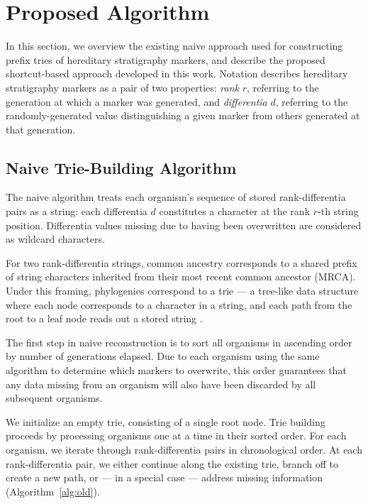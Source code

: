 \section{Proposed Algorithm} \label{sec:algorithm}

In this section, we overview the existing naive approach used for constructing prefix tries of hereditary stratigraphy markers, and describe the proposed shortcut-based approach developed in this work.
Notation describes hereditary stratigraphy markers as a pair of two properties: \textit{rank} $r$, referring to the generation at which a marker was generated, and \textit{differentia} $d$, referring to the randomly-generated value distinguishing a given marker from others generated at that generation.

\subsection{Naive Trie-Building Algorithm} \label{sec:algorithm:naive}

The naive algorithm treats each organism's sequence of stored rank-differentia pairs as a string: each differentia $d$ constitutes a character at the rank $r$-th string position.
Differentia values missing due to having been overwritten are considered as wildcard characters.

For two rank-differentia strings, common ancestry corresponds to a shared prefix of string characters inherited from their most recent common ancestor (MRCA).
Under this framing, phylogenies correspond to a trie --- a tree-like data structure where each node corresponds to a character in a string, and each path from the root to a leaf node reads out a stored string \citep{fredkin1960trie}.

The first step in naive reconstruction is to sort all organisms in ascending order by number of generations elapsed.
Due to each organism using the same algorithm to determine which markers to overwrite, this order guarantees that any data missing from an organism will also have been discarded by all subsequent organisms.

We initialize an empty trie, consisting of a single root node.
Trie building proceeds by processing organisms one at a time in their sorted order.
For each organism, we iterate through rank-differentia pairs in chronological order.
At each rank-differentia pair, we either continue along the existing trie, branch off to create a new path, or --- in a special case --- address missing information (Algorithm~\ref{alg:old}).

